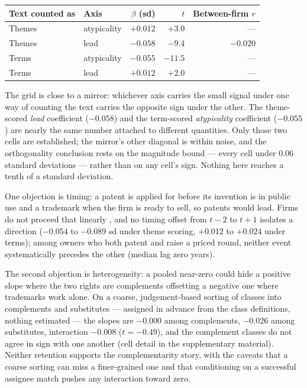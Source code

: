 \begin{center}\small
\begin{tabular}{llrrr}
\toprule
Text counted as & Axis & $\beta$ (sd) & $t$ & Between-firm $r$ \\
\midrule
Themes & atypicality & $+0.012$ & $+3.0$ & --- \\
Themes & lead        & $-0.058$ & $-9.4$ & $-0.020$ \\
Terms  & atypicality & $-0.055$ & $-11.5$ & --- \\
Terms  & lead        & $+0.012$ & $+2.0$ & --- \\
\bottomrule
\end{tabular}
\end{center}

\noindent The grid is close to a mirror: whichever axis carries the small
signal under one way of counting the text carries the opposite sign under
the other. The theme-scored \emph{lead} coefficient ($-0.058$) and the
term-scored \emph{atypicality} coefficient ($-0.055$) are nearly the same
number attached to different quantities. Only those two cells are
established; the mirror's other diagonal is within noise, and the
orthogonality conclusion rests on the magnitude bound --- every cell
under $0.06$ standard deviations --- rather than on any cell's sign.
Nothing here reaches a tenth of a standard deviation.

One objection is timing: a patent is applied for before its invention is
in public use and a trademark when the firm is ready to sell, so patents
would lead. Firms do not proceed that linearly \citep{Seip2018}, and no
timing offset from $t-2$ to $t+1$ isolates a direction ($-0.054$ to
$-0.089$ sd under theme scoring, $+0.012$ to $+0.024$ under terms);
among owners who both patent and raise a priced round, neither event
systematically precedes the other (median lag zero years).

The second objection is heterogeneity: a pooled near-zero could hide a
positive slope where the two rights are complements offsetting a negative
one where trademarks work alone. On a coarse, judgement-based sorting of
classes into complements and substitutes --- assigned in advance from the
class definitions, nothing estimated --- the slopes are $-0.000$ among
complements, $-0.026$ among substitutes, interaction $-0.008$
($t = -0.49$), and the complement classes do not agree in sign with one
another (cell detail in the supplementary material). Neither retention
supports the complementarity story, with the caveats that a coarse
sorting can miss a finer-grained one and that conditioning on a
successful assignee match pushes any interaction toward zero.

